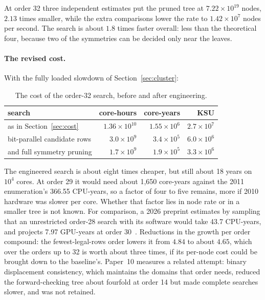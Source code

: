 \noindent At order 32 three independent estimates put the pruned tree at $7.22\times10^{19}$ nodes, $2.13$
times smaller, while the extra comparisons lower the rate to $1.42\times10^7$ nodes per second. The search is
about $1.8$ times faster overall: less than the theoretical four, because two of the symmetries can be
decided only near the leaves.

\paragraph{The revised cost.} With the fully loaded slowdown of Section~\ref{sec:cluster}:

\begin{table}[H]
\centering
\small
\begin{tabular}{@{}lrrr@{}}
\toprule
search & core-hours & core-years & KSU \\
\midrule
as in Section~\ref{sec:cost} & $1.36\times10^{10}$ & $1.55\times10^6$ & $2.7\times10^7$ \\
bit-parallel candidate rows & $3.0\times10^{9}$ & $3.4\times10^5$ & $6.0\times10^6$ \\
and full symmetry pruning & $1.7\times10^{9}$ & $1.9\times10^5$ & $3.3\times10^6$ \\
\bottomrule
\end{tabular}
\caption{The cost of the order-32 search, before and after engineering.}
\label{tab:revised}
\end{table}

\noindent The engineered search is about eight times cheaper, but still about 18 years on $10^4$ cores. At
order 29 it would need about 1{,}650 core-years against the 2011 enumeration's 366.55 CPU-years, so a factor
of four to five remains, more if 2010 hardware was slower per core. Whether that factor lies in node rate or
in a smaller tree is not known. For comparison, a 2026 preprint estimates by sampling that an
unrestricted order-28 search with its software would take 43.7 CPU-years, and projects 7.97 GPU-years
at order 30~\cite{dumitru2026localpatterns}. Reductions in the growth per order compound: the fewest-legal-rows order
lowers it from $4.84$ to about $4.65$, which over the orders up to 32 is worth about three times, if its
per-node cost could be brought down to the baseline's. Paper~10 measures a related attempt: binary
displacement consistency, which maintains the domains that order needs, reduced the forward-checking tree
about fourfold at order 14 but made complete searches slower, and was not retained.

